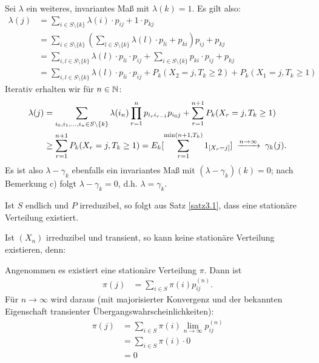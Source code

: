 \documentclass[a4paper,twoside,DIV15,BCOR12mm]{scrbook}
\begin{document}
\begin{beweis}
\begin{enuma}
\item 
  Sei $\lambda$ ein weiteres, invariantes Maß mit $\lambda(k)=1$. Es gilt also:
  \begin{align*}
    \lambda(j) &= \sum_{i \in S\setminus\{k\}} \lambda(i) \cdot p_{ij} + 1 \cdot p_{kj}\\
               &= \sum_{i \in S\setminus\{k\}} \left( \sum_{l \in S\setminus\{k\}} \lambda(l) \cdot p_{li} + p_{ki} \right) p_{ij} + p_{kj}\\
               &= \sum_{i,l \in S\setminus\{k\}} \lambda(l) \cdot p_{li} \cdot p_{ij} + \sum_{i \in S\setminus\{k\}} p_{ki} \cdot p_{ij} + p_{kj}\\
               &= \sum_{i,l \in S\setminus\{k\}} \lambda(l) \cdot p_{li} \cdot p_{ij} + P_k(X_2 = j, T_k \geq 2) + P_k(X_1 = j, T_k \geq 1)
  \end{align*}
  Iterativ erhalten wir für $n \in \mathbb{N}$:
  \begin{align*}
    \lambda(j) &= \sum_{i_0, i_1, \ldots, i_n \in S\setminus\{k\}} \lambda (i_n) \prod_{r=1}^n p_{i_ri_{r-1}} p_{i_0j} + \sum_{r=1}^{n+1} P_k(X_r = j, T_k \geq 1)\\
               &\geq \sum_{r=1}^{n+1} P_k(X_r = j, T_k \geq 1) = E_k[\sum_{r=1}^{\min(n+1,T_k)} 1_{[X_r = j]}] \tomit{n\to\infty} \gamma_k(j).
  \end{align*}
  Es ist also $\lambda - \gamma_k$ ebenfalls ein invariantes Maß mit $(\lambda - \gamma_k)(k) = 0$; nach Bemerkung c) folgt
  $\lambda - \gamma_k = 0$, d.h. $\lambda = \gamma_k$.
\end{enuma}

\end{beweis}

\begin{bemerkung}
\begin{enuma}
\item Ist $S$ endlich und $P$ irreduzibel, so folgt aus Satz \ref{satz3.1}, dass eine stationäre Verteilung existiert.
\item Ist $(X_n)$ irreduzibel und transient, so kann  keine stationäre Verteilung existieren, denn:

Angenommen es existiert eine stationäre Verteilung $\pi$. Dann ist
\begin{align*}
\pi(j) &= \sum_{i\in S} \pi(i) p_{ij}^{(n)}.
\end{align*}
Für $n\to\infty$ wird daraus (mit majorisierter Konvergenz und der bekannten Eigenschaft transienter Übergangswahrscheinlichkeiten):
\begin{align*}
\pi(j) &= \sum_{i\in S} \pi(i) \lim_{n\to\infty} p_{ij}^{(n)} \\
&= \sum_{i\in S} \pi(i) \cdot 0 \\
&= 0
\end{align*}
\end{enuma}

\end{bemerkung}
\end{document}
